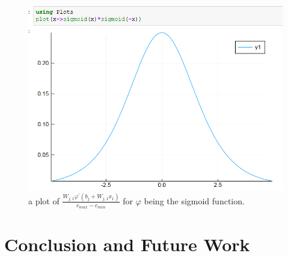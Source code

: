 \documentclass{article} %
\begin{document}
\begin{figure}
\includegraphics[scale=0.45]{figs/sigmoid-der-plot}
\caption{a plot of $\frac{W_{j,1} \varphi^\prime (b_j+W_{j,1}x_1)}{c_{max}-c_{min}}$ for $\varphi$ being the sigmoid function.}
\label{fig:sigmoidbell}
\end{figure}








	
\section{Conclusion and Future Work}



\end{document}
